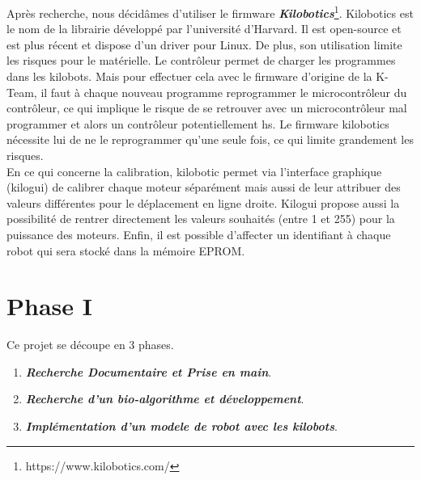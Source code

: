 \documentclass[a4paper,8pt]{report}
\begin{document}
Apr\`es recherche, nous d\'ecid\^ames d'utiliser le firmware \textit{\textbf{Kilobotics}}\footnote{https://www.kilobotics.com/}. Kilobotics est le nom de la librairie d\'evelopp\'e par l'universit\'e d'Harvard. Il est open-source et est plus r\'ecent et dispose d'un driver pour Linux. De plus, son utilisation limite les risques pour le mat\'erielle. Le contr\^oleur permet de charger les programmes dans les kilobots. Mais pour effectuer cela avec le firmware d'origine de la K-Team, il faut \`a chaque nouveau programme reprogrammer le microcontr\^oleur du contr\^oleur, ce qui implique le risque de se retrouver avec un microcontr\^oleur mal programmer et alors un contr\^oleur potentiellement hs. Le firmware kilobotics n\'ecessite lui de ne le reprogrammer qu'une seule fois, ce qui limite grandement les risques. \\
En ce qui concerne la calibration, kilobotic permet via l'interface graphique (kilogui) de calibrer chaque moteur s\'epar\'ement mais aussi de leur attribuer des valeurs diff\'erentes pour le d\'eplacement en ligne droite. Kilogui propose aussi la possibilit\'e de rentrer directement les valeurs souhait\'es (entre 1 et 255) pour la puissance des moteurs. Enfin, il est possible d'affecter un identifiant \`a chaque robot qui sera stock\'e dans la m\'emoire EPROM.\\

\chapter{Phase I}

Ce projet se d\'ecoupe en 3 phases.

\begin{enumerate}[{Phase}-1 ]
\item \textit{\textbf{Recherche Documentaire et Prise en main}}.
\item \textit{\textbf{Recherche d'un bio-algorithme et d\'eveloppement}}.
\item \textit{\textbf{Impl\'ementation d'un modele de robot avec les kilobots}}.
\end{enumerate}
\end{document}
